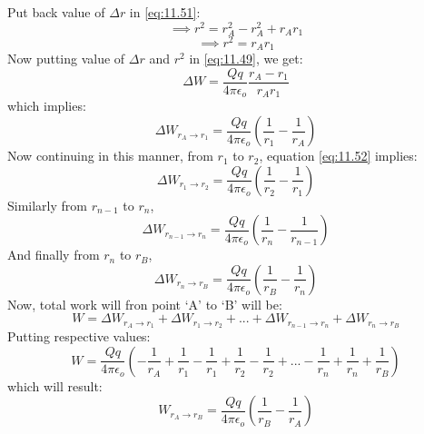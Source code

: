 Put back value of $\Delta r$ in \ref{eq:11.51}:
\begin{equation}
  \implies r^{2} = r_{A}^{2} - r_{A}^{2} + r_{A}r_{1} \nonumber 
\end{equation}
\begin{equation}
  \implies r^{2} = r_{A}r_{1} \nonumber
\end{equation}
Now putting value of $\Delta r$ and $r^{2}$ in \ref{eq:11.49}, we get:
\begin{equation}
  \Delta W = \frac{Qq}{4\pi\epsilon_{o} } \frac{r_{A} - r_{1}}{r_{A}r_{1}} \nonumber
\end{equation}
which implies:
\begin{equation}\label{eq:11.52}
  \Delta W_{r_{A}\rightarrow r_{1}} = \frac{Qq}{4\pi\epsilon_{o} } (\frac{1}{r_{1}} - \frac{1}{r_{A}})
\end{equation}
Now continuing in this manner, from $r_{1}$ to $r_{2}$, equation
\ref{eq:11.52} implies:
\begin{equation}\label{eq:11.53}
  \Delta W_{r_{1}\rightarrow r_{2}} = \frac{Qq}{4\pi\epsilon_{o} } (\frac{1}{r_{2}} - \frac{1}{r_{1}})
\end{equation}
Similarly from $r_{n-1}$ to $r_{n}$, 
\begin{equation}\label{eq:11.54}
  \Delta W_{r_{n-1}\rightarrow r_{n}} = \frac{Qq}{4\pi\epsilon_{o} } (\frac{1}{r_{n}} - \frac{1}{r_{n-1}})
\end{equation}
And finally from $r_{n}$ to $r_{B}$, 
\begin{equation}\label{eq:11.55}
  \Delta W_{r_{n}\rightarrow r_{B}} = \frac{Qq}{4\pi\epsilon_{o} } (\frac{1}{r_{B}} - \frac{1}{r_{n}})
\end{equation}
Now, total work will fron point `A' to `B' will be:
\begin{equation}\nonumber
  W = \Delta W_{r_{A}\rightarrow r_{1}} +
  \Delta W_{r_{1}\rightarrow r_{2}} + 
  ... + \Delta W_{r_{n-1}\rightarrow r_{n}} + \Delta W_{r_{n}\rightarrow r_{B}} 
\end{equation}
Putting respective values:
\begin{equation}
  W = \frac{Qq}{4\pi\epsilon_{o} } (-\frac{1}{r_{A}} +
  \frac{1}{r_{1}} -
  \frac{1}{r_{1}} +
  \frac{1}{r_{2}}-
  \frac{1}{r_{2}}+
  ...-
  \frac{1}{r_{n}}+
  \frac{1}{r_{n}}+
  \frac{1}{r_{B}}
  )\nonumber
\end{equation}
which will result:
\begin{equation}\label{eq:11.56}
   W_{r_{A}\rightarrow r_{B}} = \frac{Qq}{4\pi\epsilon_{o} } (\frac{1}{r_{B}} - \frac{1}{r_{A}})
\end{equation}
